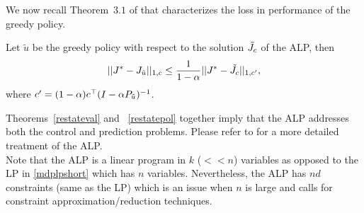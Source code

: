 We now recall Theorem~$3.1$ of \cite{ALP} that characterizes the loss in performance of the greedy policy.
\begin{theorem}\label{restatepol}
Let $\tilde{u}$ be the greedy policy with respect to the solution $\tilde{J}_c$ of the ALP, then 
\begin{align}
||J^*-J_{\tilde{u}}||_{1,c}\leq \frac{1}{1-\alpha}||J^*-\tilde{J}_c||_{1,c'},
\end{align}
where $c'=(1-\alpha)c^\top(I-\alpha P_{\tilde{u}})^{-1}$.
\end{theorem}
Theorems~\ref{restateval} and ~\ref{restatepol} together imply that the ALP addresses both the control and prediction problems. Please refer to \cite{ALP} for a more detailed treatment of the ALP.\\
Note that the ALP is a linear program in $k$ ($<<n$) variables as opposed to the LP in \eqref{mdplpshort} which has $n$ variables. Nevertheless, the ALP has $nd$ constraints (same as the LP) which is an issue when $n$ is large and calls for constraint approximation/reduction techniques.
